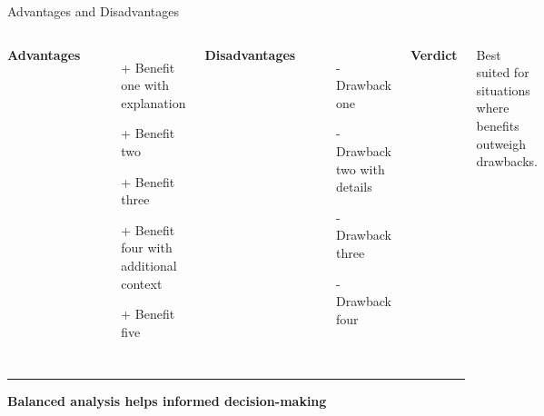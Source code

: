 \documentclass[8pt,aspectratio=169]{beamer}
\newcommand{\bottomnote}[1]{%
\vfill
\vspace{-2mm}
\textcolor{mllavender2}{\rule{\textwidth}{0.4pt}}
\vspace{1mm}
\footnotesize
\textbf{#1}
}
\begin{document}
\begin{frame}[t]{Advantages and Disadvantages}
\begin{columns}[T]
\textbf{Advantages}
\begin{itemize}
\item[\textcolor{mlgreen}{+}] Benefit one with explanation
\item[\textcolor{mlgreen}{+}] Benefit two
\item[\textcolor{mlgreen}{+}] Benefit three
\item[\textcolor{mlgreen}{+}] Benefit four with additional context
\item[\textcolor{mlgreen}{+}] Benefit five
\end{itemize}

\textbf{Disadvantages}
\begin{itemize}
\item[\textcolor{mlorange}{-}] Drawback one
\item[\textcolor{mlorange}{-}] Drawback two with details
\item[\textcolor{mlorange}{-}] Drawback three
\item[\textcolor{mlorange}{-}] Drawback four
\end{itemize}

\vspace{0.5em}
\textbf{Verdict}

Best suited for situations where benefits outweigh drawbacks.
\end{columns}

\bottomnote{Balanced analysis helps informed decision-making}
\end{frame}
\end{document}
